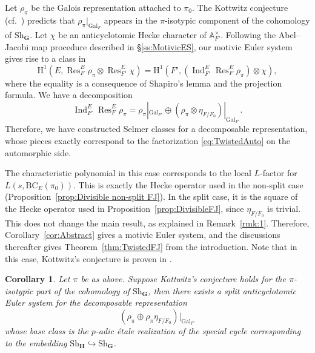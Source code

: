 \documentclass{amsart}
\newtheorem{cor}[theorem]{Corollary}
\theoremstyle{definition}
\theoremstyle{remark}
\newcommand{\1}{\mathbf{1}}
\newcommand{\A}{\mathbb{A}}
\newcommand{\h}{\mathrm{H}}
\DeclareMathOperator{\Gal}{Gal}
\DeclareMathOperator{\Ind}{Ind}
\DeclareMathOperator{\Res}{Res}
\theoremstyle{definition}
\newcommand{\bH}{\mathbf{H}}
\newcommand{\bG}{\mathbf{G}}
\newcommand{\Sh}{\mathrm{Sh}}
\newcommand{\BC}{\mathrm{BC}}
\begin{document}
Let $\rho_\pi$ be the Galois representation attached to $\pi_0$. The Kottwitz conjecture (cf.~\cite[Conjecture 5.2]{BlasiusRogawski}) predicts that $\rho_\pi|_{\Gal_F}$ appears in the $\pi$-isotypic component of the cohomology of $\Sh_{\bG}$. Let $\chi$ be an anticyclotomic Hecke character of $\A_{F'}^\times$. Following the Abel--Jacobi map procedure described in \S\ref{ss:MotivicES}, our motivic Euler system gives rise to a class in
\[
    \h^1(E,\Res^E_F\rho_\pi\otimes\Res^E_{F'}\chi)=\h^1(F',(\Ind_{F'}^E\Res^E_F\rho_\pi)\otimes\chi),
\]
where the equality is a consequence of Shapiro's lemma and the projection formula. We have a decomposition
\[
    \Ind_{F'}^E\Res^E_F\rho_\pi=\rho_{\pi}|_{\Gal_{F'}}\oplus(\rho_\pi\otimes\eta_{F/F_0})|_{\Gal_{F'}}.
\]
Therefore, we have constructed Selmer classes for a decomposable representation, whose pieces exactly correspond to the factorization \eqref{eq:TwistedAuto} on the automorphic side.

The characteristic polynomial in this case corresponds to the local $L$-factor for $L(s,\BC_E(\pi_0))$. This is exactly the Hecke operator used in the non-split case (Proposition~\ref{prop:Divisible non-split FJ}). In the split case, it is the square of the Hecke operator used in Proposition~\ref{prop:DivisibleFJ}, since $\eta_{F/F_0}$ is trivial. This does not change the main result, as explained in Remark~\ref{rmk:1}. Therefore, Corollary~\ref{cor:Abstract} gives a motivic Euler system, and the discussions thereafter gives Theorem~\ref{thm:TwistedFJ} from the introduction. Note that in this case, Kottwitz's conjecture is proven in \cite{KSZ}.

\begin{cor}
    Let $\pi$ be as above. Suppose Kottwitz's conjecture holds for the $\pi$-isotypic part of the cohomology of $\Sh_\bG$, then there exists a split anticyclotomic Euler system for the decomposable representation
    \[
        (\rho_\pi\oplus\rho_\pi\eta_{F/F_0})|_{\Gal_{F'}}
    \]
    whose base class is the $p$-adic \'{e}tale realization of the special cycle corresponding to the embedding $\Sh_{\bH}\hookrightarrow\Sh_\bG$.
\end{cor}
\end{document}
